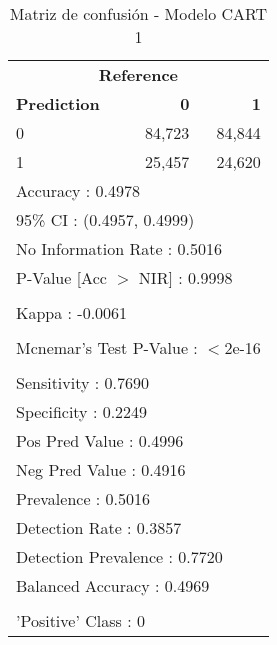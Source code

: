 \begin{table}[htbp]
\centering
\caption{Matriz de confusión - Modelo CART 1}
\label{tab:confusion-cart1}
\begin{tabular}{lrr}
\toprule
\multicolumn{3}{c}{\textbf{Reference}} \\
\textbf{Prediction} & \textbf{0} & \textbf{1} \\
\midrule
0 & 84,723 & 84,844 \\
1 & 25,457 & 24,620 \\
\midrule
\multicolumn{3}{l}{Accuracy : 0.4978} \\
\multicolumn{3}{l}{95\% CI : (0.4957, 0.4999)} \\
\multicolumn{3}{l}{No Information Rate : 0.5016} \\
\multicolumn{3}{l}{P-Value [Acc $>$ NIR] : 0.9998} \\
\\
\multicolumn{3}{l}{Kappa : -0.0061} \\
\\
\multicolumn{3}{l}{Mcnemar's Test P-Value : $<$2e-16} \\
\\
\multicolumn{3}{l}{Sensitivity : 0.7690} \\
\multicolumn{3}{l}{Specificity : 0.2249} \\
\multicolumn{3}{l}{Pos Pred Value : 0.4996} \\
\multicolumn{3}{l}{Neg Pred Value : 0.4916} \\
\multicolumn{3}{l}{Prevalence : 0.5016} \\
\multicolumn{3}{l}{Detection Rate : 0.3857} \\
\multicolumn{3}{l}{Detection Prevalence : 0.7720} \\
\multicolumn{3}{l}{Balanced Accuracy : 0.4969} \\
\\
\multicolumn{3}{l}{'Positive' Class : 0} \\
\bottomrule
\end{tabular}
\end{table}